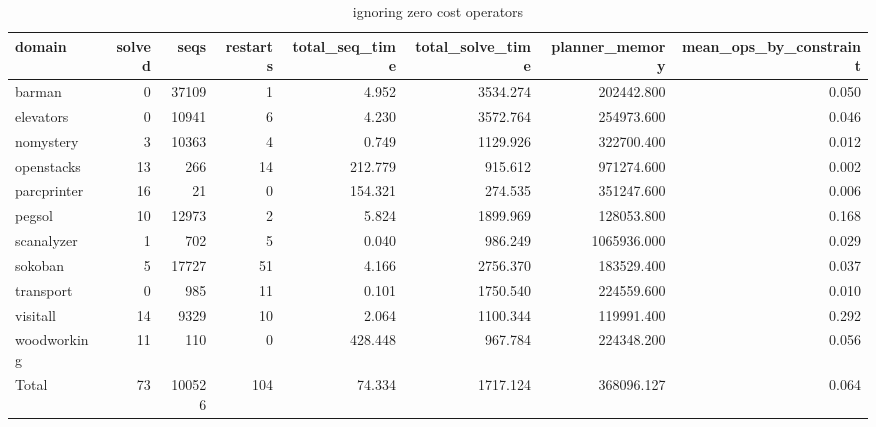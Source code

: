 \begin{table*}[ht]
\centering
\begin{tabular}{lrrrrrrr}
  \hline
domain & solved & seqs & restarts & total\_seq\_time & total\_solve\_time & planner\_memory & mean\_ops\_by\_constraint \\ 
  \hline
barman &    0 & 37109 &    1 & 4.952 & 3534.274 & 202442.800 & 0.050 \\ 
  elevators &    0 & 10941 &    6 & 4.230 & 3572.764 & 254973.600 & 0.046 \\ 
  nomystery &    3 & 10363 &    4 & 0.749 & 1129.926 & 322700.400 & 0.012 \\ 
  openstacks &   13 &  266 &   14 & 212.779 & 915.612 & 971274.600 & 0.002 \\ 
  parcprinter &   16 &   21 &    0 & 154.321 & 274.535 & 351247.600 & 0.006 \\ 
  pegsol &   10 & 12973 &    2 & 5.824 & 1899.969 & 128053.800 & 0.168 \\ 
  scanalyzer &    1 &  702 &    5 & 0.040 & 986.249 & 1065936.000 & 0.029 \\ 
  sokoban &    5 & 17727 &   51 & 4.166 & 2756.370 & 183529.400 & 0.037 \\ 
  transport &    0 &  985 &   11 & 0.101 & 1750.540 & 224559.600 & 0.010 \\ 
  visitall &   14 & 9329 &   10 & 2.064 & 1100.344 & 119991.400 & 0.292 \\ 
  woodworking &   11 &  110 &    0 & 428.448 & 967.784 & 224348.200 & 0.056 \\ 
  Total &   73 & 100526 &  104 & 74.334 & 1717.124 & 368096.127 & 0.064 \\ 
   \hline
\end{tabular}
\caption{\oursolver{} ignoring zero cost operators} 
\label{tab:our_ignoring}
\end{table*}
